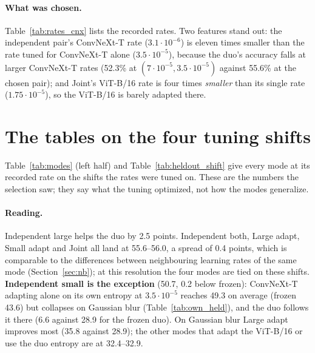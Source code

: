 \documentclass[10pt]{article}
\newcommand{\vit}{ViT-B/16}
\newcommand{\cnx}{ConvNeXt-T}
\newcommand{\lr}[2]{\(#1{\cdot}10^{#2}\)}
\begin{document}
\paragraph{What was chosen.} Table~\ref{tab:rates_cnx} lists the recorded rates. Two features stand out: the independent pair's \cnx{} rate (\lr{3.1}{-6}) is eleven times smaller than the rate tuned for \cnx{} alone (\lr{3.5}{-5}), because the duo's accuracy falls at larger \cnx{} rates (52.3\% at \((7{\cdot}10^{-5}, 3.5{\cdot}10^{-5})\) against 55.6\% at the chosen pair); and Joint's \vit{} rate is four times \emph{smaller} than its single rate (\lr{1.75}{-5}), so the \vit{} is barely adapted there.

\section{The tables on the four tuning shifts}\label{sec:held}
Table~\ref{tab:modes} (left half) and Table~\ref{tab:heldout_shift} give every mode at its recorded rate on the shifts the rates were tuned on. These are the numbers the selection saw; they say what the tuning optimized, not how the modes generalize.

\begin{table}[H]
  \centering\small
  \caption{Every mode, accuracy (\%) averaged over the corruptions of the stream, mean over 3 seeds; $\pm$ is the std over seeds of the duo's average. Left: the four tuning shifts. Right: the 15 test corruptions (Section~\ref{sec:test}).}
  \label{tab:modes}
  
\end{table}

\begin{table}[H]
  \centering\small
  \caption{The duo's accuracy (\%) on each tuning shift under every mode, mean over 3 seeds.}
  \label{tab:heldout_shift}
  
\end{table}

\paragraph{Reading.} Independent large helps the duo by 2.5 points. Independent both, Large adapt, Small adapt and Joint all land at 55.6--56.0, a spread of 0.4 points, which is comparable to the differences between neighbouring learning rates of the same mode (Section~\ref{sec:nb}); at this resolution the four modes are tied on these shifts. \textbf{Independent small is the exception} (50.7, 0.2 below frozen): \cnx{} adapting alone on its own entropy at \(3.5{\cdot}10^{-5}\) reaches 49.3 on average (frozen 43.6) but collapses on Gaussian blur (Table~\ref{tab:own_held}), and the duo follows it there (6.6 against 28.9 for the frozen duo). On Gaussian blur Large adapt improves most (35.8 against 28.9); the other modes that adapt the \vit{} or use the duo entropy are at 32.4--32.9.
\end{document}
